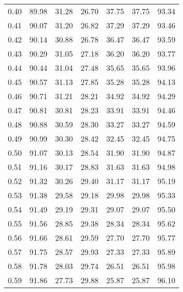 \begin{tabular}{|c|c|c|c|c|c|c|}
      0.40 &     89.98 &     31.28 &      26.70 &   37.75 &      37.75 &         93.34 \\
      0.41 &     90.07 &     31.20 &      26.82 &   37.29 &      37.29 &         93.46 \\
      0.42 &     90.14 &     30.88 &      26.78 &   36.47 &      36.47 &         93.59 \\
      0.43 &     90.29 &     31.05 &      27.18 &   36.20 &      36.20 &         93.77 \\
      0.44 &     90.44 &     31.04 &      27.48 &   35.65 &      35.65 &         93.96 \\
      0.45 &     90.57 &     31.13 &      27.85 &   35.28 &      35.28 &         94.13 \\
      0.46 &     90.71 &     31.21 &      28.21 &   34.92 &      34.92 &         94.29 \\
      0.47 &     90.81 &     30.81 &      28.23 &   33.91 &      33.91 &         94.46 \\
      0.48 &     90.88 &     30.59 &      28.30 &   33.27 &      33.27 &         94.59 \\
      0.49 &     90.99 &     30.30 &      28.42 &   32.45 &      32.45 &         94.75 \\
      0.50 &     91.07 &     30.13 &      28.54 &   31.90 &      31.90 &         94.87 \\
      0.51 &     91.16 &     30.17 &      28.83 &   31.63 &      31.63 &         94.98 \\
      0.52 &     91.32 &     30.26 &      29.40 &   31.17 &      31.17 &         95.19 \\
      0.53 &     91.38 &     29.58 &      29.18 &   29.98 &      29.98 &         95.33 \\
      0.54 &     91.49 &     29.19 &      29.31 &   29.07 &      29.07 &         95.50 \\
      0.55 &     91.56 &     28.85 &      29.38 &   28.34 &      28.34 &         95.62 \\
      0.56 &     91.66 &     28.61 &      29.59 &   27.70 &      27.70 &         95.77 \\
      0.57 &     91.75 &     28.57 &      29.93 &   27.33 &      27.33 &         95.89 \\
      0.58 &     91.78 &     28.03 &      29.74 &   26.51 &      26.51 &         95.98 \\
      0.59 &     91.86 &     27.73 &      29.88 &   25.87 &      25.87 &         96.10 \\

\end{tabular}
